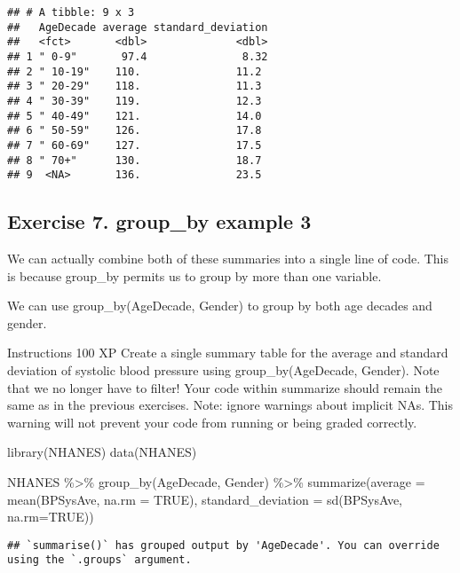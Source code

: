 \documentclass[
]{article}
\newenvironment{Shaded}{\begin{snugshade}}{\end{snugshade}}
\newcommand{\AttributeTok}[1]{\textcolor[rgb]{0.77,0.63,0.00}{#1}}
\newcommand{\ConstantTok}[1]{\textcolor[rgb]{0.00,0.00,0.00}{#1}}
\newcommand{\FunctionTok}[1]{\textcolor[rgb]{0.00,0.00,0.00}{#1}}
\newcommand{\NormalTok}[1]{#1}
\newcommand{\SpecialCharTok}[1]{\textcolor[rgb]{0.00,0.00,0.00}{#1}}
\begin{document}
\begin{verbatim}
## # A tibble: 9 x 3
##   AgeDecade average standard_deviation
##   <fct>       <dbl>              <dbl>
## 1 " 0-9"       97.4               8.32
## 2 " 10-19"    110.               11.2 
## 3 " 20-29"    118.               11.3 
## 4 " 30-39"    119.               12.3 
## 5 " 40-49"    121.               14.0 
## 6 " 50-59"    126.               17.8 
## 7 " 60-69"    127.               17.5 
## 8 " 70+"      130.               18.7 
## 9  <NA>       136.               23.5
\end{verbatim}

\hypertarget{exercise-7.-group_by-example-3}{%
\subsection{Exercise 7. group\_by example
3}\label{exercise-7.-group_by-example-3}}

We can actually combine both of these summaries into a single line of
code. This is because group\_by permits us to group by more than one
variable.

We can use group\_by(AgeDecade, Gender) to group by both age decades and
gender.

Instructions 100 XP Create a single summary table for the average and
standard deviation of systolic blood pressure using group\_by(AgeDecade,
Gender). Note that we no longer have to filter! Your code within
summarize should remain the same as in the previous exercises. Note:
ignore warnings about implicit NAs. This warning will not prevent your
code from running or being graded correctly.

\begin{Shaded}
\begin{Highlighting}[]
\FunctionTok{library}\NormalTok{(NHANES)}
\FunctionTok{data}\NormalTok{(NHANES)}

\NormalTok{NHANES }\SpecialCharTok{\%\textgreater{}\%}
      \FunctionTok{group\_by}\NormalTok{(AgeDecade, Gender) }\SpecialCharTok{\%\textgreater{}\%}
      \FunctionTok{summarize}\NormalTok{(}\AttributeTok{average =} \FunctionTok{mean}\NormalTok{(BPSysAve, }\AttributeTok{na.rm =} \ConstantTok{TRUE}\NormalTok{), }
            \AttributeTok{standard\_deviation =} \FunctionTok{sd}\NormalTok{(BPSysAve, }\AttributeTok{na.rm=}\ConstantTok{TRUE}\NormalTok{))}
\end{Highlighting}
\end{Shaded}

\begin{verbatim}
## `summarise()` has grouped output by 'AgeDecade'. You can override using the `.groups` argument.
\end{verbatim}
\end{document}

